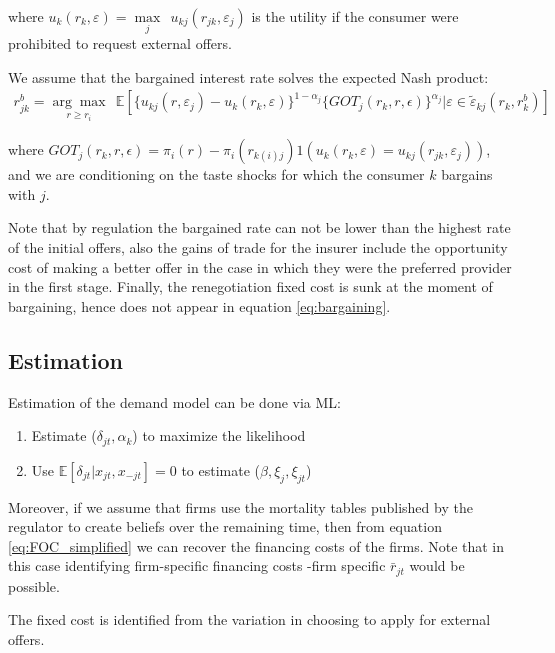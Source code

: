 \documentclass[12pt]{article}
\theoremstyle{plain}
\theoremstyle{plain}
\begin{document}
where $u_{k}(r_k, \varepsilon) = \underset{j}{\max} \ \ u_{kj}(r_{jk}, \varepsilon_j)$ is the utility if the consumer were prohibited to request external offers. 

We assume that the bargained interest rate solves the expected Nash product:  
\begin{align}\label{eq:bargaining}
    r_{jk}^b = \underset{r\geq r_i}{\arg \max} \ \  \mathbb{E}\left[
    \{u_{kj}(r, \varepsilon_j) -u_{k}(r_k, \varepsilon)\} ^{1-\alpha_j} 
    \{GOT_j(r_k, r, \epsilon) \}^{\alpha_j}
    | \varepsilon \in \tilde{\varepsilon}_{kj}(r_k, r_{k}^b)
    \right] 
\end{align}

where $GOT_j(r_k, r, \epsilon) = \pi_i(r)-\pi_i(r_{k(i)j}) 1( u_k(r_k, \varepsilon) = u_{kj}(r_{jk}, \varepsilon_j))$, and we are conditioning on the taste shocks for which the consumer $k$ bargains with $j$. 

Note that by regulation the bargained rate can not be lower than the highest rate of the initial offers, also the gains of trade for the insurer include the opportunity cost of making a better offer in the case in which they were the preferred provider in the first stage. Finally, the renegotiation fixed cost is sunk at the moment of bargaining, hence does not appear in equation \ref{eq:bargaining}. 





\subsection*{Estimation}
Estimation of the demand model can be done via ML: 
\begin{enumerate}
    \item Estimate  ($\delta_{jt}, \alpha_k$) to maximize the likelihood 
    \item Use $\mathbb{E}[\delta_{jt}|x_{jt},x_{-jt}]= 0$ to estimate ($\beta, \xi_j, \xi_{jt}$)
\end{enumerate}

Moreover, if we assume that firms use the mortality tables published by the regulator to create beliefs over the remaining time, then from equation \ref{eq:FOC_simplified} we can recover the financing costs of the firms. Note that in this case identifying firm-specific financing costs -firm specific $\bar{r}_{jt}$ would be possible. 

The fixed cost is identified from the variation in choosing to apply for external offers. 




\printbibliography
 
\end{document}
